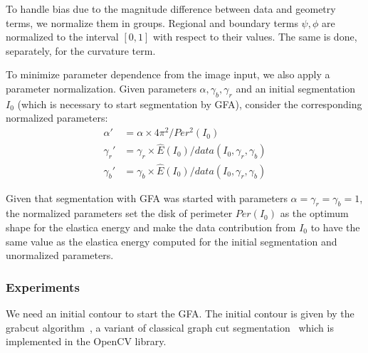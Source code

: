 \documentclass[review]{siamart220329}
\begin{document}
%
%
To handle bias due to the magnitude difference between data and geometry terms,
we normalize them in groups. Regional and boundary terms $\psi,\phi$ are
normalized to the interval $[0,1]$ with respect to their values. The same is
done, separately, for the curvature term.

To minimize parameter dependence from the image input, we also apply a parameter
normalization. Given parameters $\alpha, \gamma_b, \gamma_r$ and an initial
segmentation $I_0$ (which is necessary to start segmentation by GFA), consider
the corresponding normalized parameters:
%
%
\begin{align*}
    \alpha' & = \alpha \times 4\pi^2/Per^2(I_0) \\
	\gamma_r' & = \gamma_r \times \hat{E}(I_0)/data(I_0,\gamma_r,\gamma_b) \\	
	\gamma_b' & = \gamma_b \times \hat{E}(I_0)/data(I_0,\gamma_r,\gamma_b)		
\end{align*}

Given that segmentation with GFA was started with parameters
$\alpha=\gamma_r=\gamma_b=1$, the normalized parameters set the disk of
perimeter $Per(I_0)$ as the optimum shape for the elastica energy and make the
data contribution from $I_0$ to have the same value as the elastica energy
computed for the initial segmentation and unormalized parameters.
%
%
\subsubsection{Experiments}
We need an initial contour to start the GFA. The initial contour is given by the
grabcut algorithm~\cite{rother04grabcut}, a variant of classical graph cut
segmentation~\cite{boykov01graphcut} which is implemented in the OpenCV library.
\end{document}
